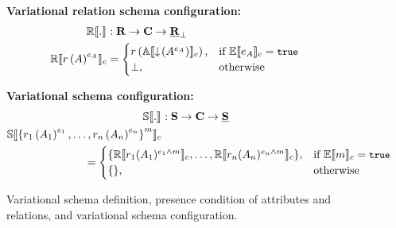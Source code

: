 \begin{figure}
%
\medskip
\textbf{Variational relation schema configuration:}
\begin{alignat*}{1}%
\orSem [] . &: \vRelSchSet \to \confSet  \to \maybe \pRelSchSet\\
%
\orSem {\vRelDef [\vRel] [\dimMeta_\vAttList]} &= 
	\begin{cases}
		\vRel\left({\olSem {\pushIn { \annot [\dimMeta_\vAttList] \vAttList}}}\right), &\If \fSem {\dimMeta_\vAttList} = \t\\
		\bot, &\Otherwise
	\end{cases}
\end{alignat*}

%
\medskip
\textbf{Variational schema configuration:}
\begin{alignat*}{1}%
\osSem [] . &: \vSchSet \to \confSet \to \pSchSet\\
%
\osSem {\annot [\fModel] {\setDef {\vRelDefNum 1, \ldots, \vRelDefNum \numRels}}}\\
&\hspace{-70pt}= \begin{cases}
                 \setDef {\orSem {\vRel_1( \vAttList_1 )^{\dimMeta_1 {\wedge \fModel}} }, \ldots, 
                 \orSem {\vRel_\numRels( \vAttList_\numRels)^{\dimMeta_\numRels {\wedge \fModel}} }},	
                         & \If \fSem {\fModel } =\t \\	
        \setDef{}, & \text{otherwise}
	\end{cases}
\end{alignat*}


\caption{Variational schema definition, presence condition of attributes and relations, and variational schema configuration.}
\label{fig:vsch}
\end{figure} 
